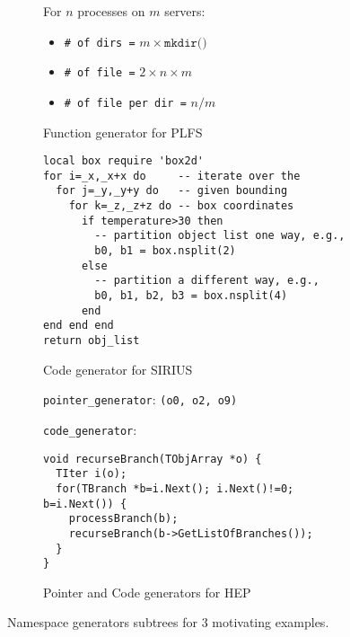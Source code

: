 \begin{figure}[tb]
  \centering
  \begin{subfigure}[b]{1\linewidth}
    For \(n\) processes on \(m\) servers:
    \begin{itemize}
      \setlength\itemsep{-0.5em}
      \item[] \texttt{\# of dirs =} \(m \times \texttt{mkdir()}\)
      \item[] \texttt{\# of file =} \(2 \times n \times m\)
      \item[] \texttt{\# of file per dir =} \(n/m\)
    \end{itemize}
    \caption{Function generator for PLFS\vspace{1em}} \label{fig:plfs}
  \end{subfigure}

  \begin{subfigure}[b]{1\linewidth}
      \footnotesize
      \begin{verbatim}
local box require 'box2d'
for i=_x,_x+x do     -- iterate over the
  for j=_y,_y+y do   -- given bounding
    for k=_z,_z+z do -- box coordinates
      if temperature>30 then
        -- partition object list one way, e.g.,
        b0, b1 = box.nsplit(2)
      else
        -- partition a different way, e.g.,
        b0, b1, b2, b3 = box.nsplit(4)
      end
end end end
return obj_list
     \end{verbatim}
      \caption{Code generator for SIRIUS\vspace{1em}} \label{fig:sirius}
  \end{subfigure}

  \begin{subfigure}[b]{1\linewidth}

\noindent\texttt{pointer\_generator}: \texttt{(o0, o2, o9)}

\noindent\texttt{code\_generator}:

      \centering
      \footnotesize
      \begin{verbatim}
void recurseBranch(TObjArray *o) {
  TIter i(o); 
  for(TBranch *b=i.Next(); i.Next()!=0; b=i.Next()) {
    processBranch(b);
    recurseBranch(b->GetListOfBranches());
  }
}
      \end{verbatim}
      \caption{Pointer and Code generators for HEP\vspace{1em}} \label{fig:hep}
  \end{subfigure}
\caption{Namespace generators subtrees for 3 motivating examples.\label{fig:use-cases}}
\end{figure}

